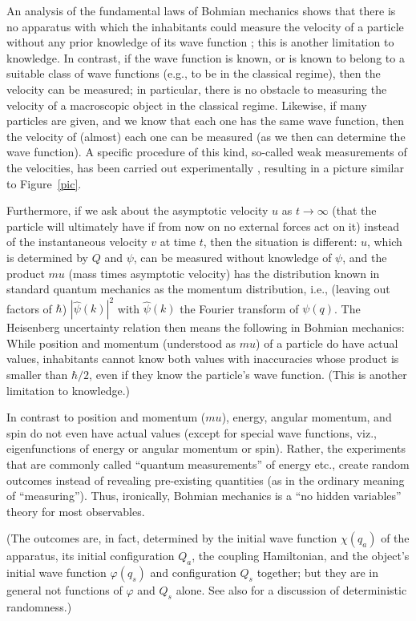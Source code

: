 \documentclass[12pt]{article}
\begin{document}
An analysis of the fundamental laws of Bohmian mechanics shows that there is no apparatus with which the inhabitants could measure the velocity of a particle without any prior knowledge of its wave function \cite{DGZ04}; this is another limitation to knowledge. In contrast, if the wave function is known, or is known to belong to a suitable class of wave functions (e.g., to be in the classical regime), then the velocity can be measured; in particular, there is no obstacle to measuring the velocity of a macroscopic object in the classical regime. Likewise, if many particles are given, and we know that each one has the same wave function, then the velocity of (almost) each one can be measured (as we then can determine the wave function). A specific procedure \cite{Wis07,DGZ09} of this kind, so-called weak measurements of the velocities, has been carried out experimentally \cite{Steinberg}, resulting in a picture similar to Figure~\ref{pic}. 

Furthermore, if we ask about the asymptotic velocity $u$ as $t\to\infty$ (that the particle will ultimately have if from now on no external forces act on it) instead of the instantaneous velocity $v$ at time $t$, then the situation is different: $u$, which is determined by $Q$ and $\psi$, can be measured without knowledge of $\psi$, and the product $mu$ (mass times asymptotic velocity) has the distribution known in standard quantum mechanics as the momentum distribution, i.e., (leaving out factors of $\hbar$) $|\hat\psi(k)|^2$ with $\hat\psi(k)$ the Fourier transform of $\psi(q)$. The Heisenberg uncertainty relation then means the following in Bohmian mechanics: While position and momentum (understood as $mu$) of a particle do have actual values, inhabitants cannot know both values with inaccuracies whose product is smaller than $\hbar/2$, even if they know the particle's wave function. (This is another limitation to knowledge.)

In contrast to position and momentum ($mu$), energy, angular momentum, and spin do not even have actual values (except for special wave functions, viz., eigenfunctions of energy or angular momentum or spin). Rather, the experiments that are commonly called ``quantum measurements'' of energy etc., create random outcomes instead of revealing pre-existing quantities (as in the ordinary meaning of ``measuring''). 
Thus, ironically, Bohmian mechanics is a ``no hidden variables'' theory for most observables. 

(The outcomes are, in fact, determined by the initial wave function $\chi(q_a)$ of the apparatus, its initial configuration $Q_a$, the coupling Hamiltonian, and the object's initial wave function $\varphi(q_s)$ and configuration $Q_s$ together; but they are in general not functions of $\varphi$ and $Q_s$ alone. See also \cite{Emery} for a discussion of deterministic randomness.)
\end{document}
